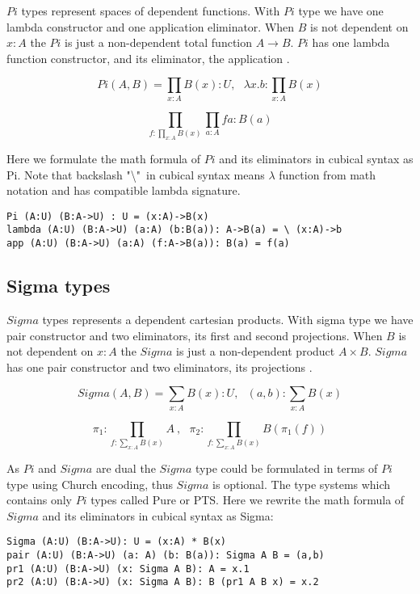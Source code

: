 \documentclass{article}
\begin{document}
$Pi$ types represent spaces of dependent functions.
With $Pi$ type we have one lambda constructor
and one application eliminator. When $B$ is not dependent on $x:A$
the $Pi$ is just a non-dependent total function $A \rightarrow B$.
$Pi$ has one lambda function constructor, and its eliminator, the
application \cite{HoTT, Lof72, Lof84, Hofmann96, Mortberg17, Ulf09}.

$$Pi(A,B) = \prod_{x:A} B(x) : U,\ \ \ 
  \lambda x . b : \prod_{x:A} B(x)$$

$$\prod_{f:\prod_{x:A}B(x)}\prod_{a:A} f a : B (a)$$

Here we formulate the math formula of $Pi$ and its eliminators in cubical syntax as Pi.
Note that backslash "\textbackslash"\  in cubical syntax means $\lambda$ function from math notation
and has compatible lambda signature.

\begin{lstlisting}[mathescape=true]
Pi (A:U) (B:A->U) : U = (x:A)->B(x)
lambda (A:U) (B:A->U) (a:A) (b:B(a)): A->B(a) = \ (x:A)->b
app (A:U) (B:A->U) (a:A) (f:A->B(a)): B(a) = f(a)
\end{lstlisting}

\subsection{Sigma types}

$Sigma$ types represents a dependent cartesian products.
With sigma type we have pair constructor and two eliminators,
its first and second projections. When $B$ is not dependent on $x:A$
the $Sigma$ is just a non-dependent product $A \times B$.
$Sigma$ has one pair constructor and two eliminators, its projections
\cite{HoTT, Lof72, Lof84, Hofmann96, Mortberg17, Ulf09}.

$$Sigma(A,B) = \sum_{x:A} B(x) : U,\ \ \ 
  (a,b) : \sum_{x:A} B(x)$$

$$\pi_1 : \prod_{f:\sum_{x:A}B(x)}A\ ,\ \ \ \pi_2 : \prod_{f:\sum_{x:A}B(x)}B(\pi_1(f))$$

As $Pi$ and $Sigma$ are dual the $Sigma$ type could be formulated
in terms of $Pi$ type using Church encoding, thus $Sigma$ is optional.
The type systems which contains only $Pi$ types called Pure or PTS.
Here we rewrite the math formula of $Sigma$ and its eliminators in cubical syntax as Sigma:

\begin{lstlisting}[mathescape=true]
Sigma (A:U) (B:A->U): U = (x:A) * B(x)
pair (A:U) (B:A->U) (a: A) (b: B(a)): Sigma A B = (a,b)
pr1 (A:U) (B:A->U) (x: Sigma A B): A = x.1
pr2 (A:U) (B:A->U) (x: Sigma A B): B (pr1 A B x) = x.2
\end{lstlisting}
\end{document}
